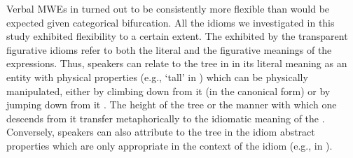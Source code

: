 \documentclass[output=paper]{langsci/langscibook}
\begin{document}
Verbal\ili{} MWEs\ili{} in\ili{} \ili{}\ili{}\ili{} turned\ili{} out\ili{} to\ili{} be\ili{} consistently\ili{} more\ili{} flexible\ili{} than\ili{} would\ili{} be\ili{} expected\ili{} given\ili{} \ili{}\quotecite{}\ili{} categorical\ili{} bifurcation\ili{}.\ili{} All\ili{} the\ili{} idioms\ili{} we\ili{} investigated\ili{} in\ili{} this\ili{} study\ili{} exhibited\ili{} flexibility\ili{} to\ili{} a\ili{} certain\ili{} extent\ili{}.\ili{} The\ili{} \ili{}\isi{}\ili{} exhibited\ili{} by\ili{} the\ili{} transparent\ili{} figurative\ili{} idioms\ili{} refer\ili{} to\ili{} both\ili{} the\ili{} literal\ili{} and\ili{} the\ili{} figurative\ili{} meanings\ili{} of\ili{} the\ili{} expressions\ili{}.\ili{} Thus\ili{},\ili{} speakers\ili{} can\ili{} relate\ili{} to\ili{} the\ili{} tree\ili{} in\ili{} \ili{}\idgloss{}\ili{} in\ili{} its\ili{} literal\ili{} meaning\ili{} as\ili{} an\ili{} entity\ili{} with\ili{} physical\ili{} properties\ili{} \ili{}(e\ili{}.g\ili{}.\ili{},\ili{} \ili{}`tall\ili{}'\ili{} in\ili{} \ili{}\ili{})\ili{} which\ili{} can\ili{} be\ili{} physically\ili{} manipulated\ili{},\ili{} either\ili{} by\ili{} climbing\ili{} down\ili{} from\ili{} it\ili{} \ili{}(in\ili{} the\ili{} canonical\ili{} form\ili{})\ili{} or\ili{} by\ili{} jumping\ili{} down\ili{} from\ili{} it\ili{} \ili{}\ili{}.\ili{} The\ili{} height\ili{} of\ili{} the\ili{} tree\ili{} or\ili{} the\ili{} manner\ili{} with\ili{} which\ili{} one\ili{} descends\ili{} \ili{} from\ili{} it\ili{} transfer\ili{} metaphorically\ili{} to\ili{} the\ili{} idiomatic\ili{} meaning\ili{} of\ili{} the\ili{} \ili{}\isi{}\ili{}.\ili{} Conversely\ili{},\ili{} speakers\ili{} can\ili{} also\ili{} attribute\ili{} to\ili{} the\ili{} tree\ili{} in\ili{} the\ili{} idiom\ili{} abstract\ili{} properties\ili{} which\ili{} are\ili{} only\ili{} appropriate\ili{} in\ili{} the\ili{} context\ili{} of\ili{} the\ili{} idiom\ili{} \ili{}(e\ili{}.g\ili{}.\ili{},\ili{} \ili{}\hebgloss{}\ili{} in\ili{} \ili{}\ili{})\ili{}.\ili{}
\ili{}
\end{document}
